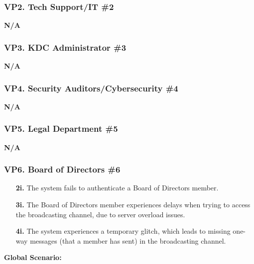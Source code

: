 \documentclass[]{article}
\begin{document}
\subsubsection*{VP2. Tech Support/IT \#2}
\textbf{N/A}
\subsubsection*{VP3. KDC Administrator \#3}
\textbf{N/A}
\subsubsection*{VP4. Security Auditors/Cybersecurity \#4}
\textbf{N/A}
\subsubsection*{VP5. Legal Department \#5}
\textbf{N/A}
\subsubsection*{VP6. Board of Directors \#6}
\begin{enumerate}
	\item[\textbf{2i.}] The system fails to authenticate a Board of Directors member.
	\item[\textbf{3i.}] The Board of Directors member experiences delays when trying to access the broadcasting channel, due to server overload issues.
	\item[\textbf{4i.}] The system experiences a temporary glitch, which leads to missing one-way messages (that a member has sent) in the broadcasting channel.
\end{enumerate}
\textbf{Global Scenario:}
\end{document}
